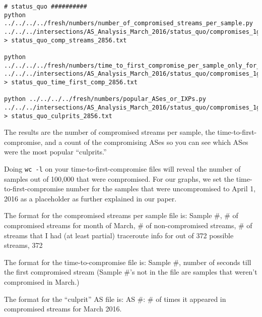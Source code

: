 \documentclass{article}
\begin{document}
\begin{lstlisting}
# status_quo ##########
python ../../../../fresh/numbers/number_of_compromised_streams_per_sample.py ../../../intersections/AS_Analysis_March_2016/status_quo/compromises_1guard_100K_2856.pickle > status_quo_comp_streams_2856.txt

python ../../../../fresh/numbers/time_to_first_compromise_per_sample_only_for_comp.py ../../../intersections/AS_Analysis_March_2016/status_quo/compromises_1guard_100K_2856.pickle > status_quo_time_first_comp_2856.txt

python ../../../../fresh/numbers/popular_ASes_or_IXPs.py ../../../intersections/AS_Analysis_March_2016/status_quo/compromises_1guard_100K_2856.pickle > status_quo_culprits_2856.txt
\end{lstlisting}

The results are 
the number of compromised streams per sample, the time-to-first-compromise, and a count 
of the compromising ASes so you can see which ASes were the most popular ``culprits.'' 

Doing {\tt wc -l} on your time-to-first-compromise files will reveal the number 
of samples out of 100,000 that were compromised. For our graphs, we set the 
time-to-first-compromise number for the samples that were uncompromised to 
April 1, 2016 as a placeholder as further explained in our paper.

The format for the compromised streams per sample file is:
Sample \#, \# of compromised streams for month of March, \# of non-compromised streams, \# of streams 
that I had (at least partial) traceroute info for out of 372 possible streams, 372

The format for the time-to-compromise file is:
Sample \#, number of seconds till the first compromised stream 
(Sample \#'s not in the file are samples that weren't compromised in March.)

The format for the ``culprit'' AS file is:
AS \#: \# of times it appeared in compromised streams for March 2016.

\printbibliography
\end{document}
